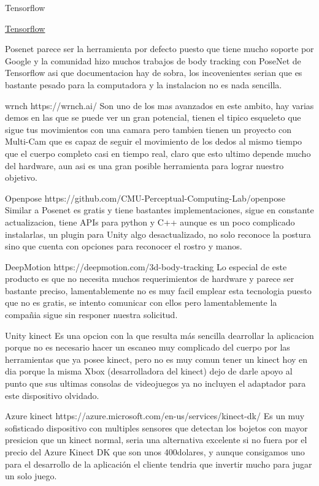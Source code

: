 Tensorflow

\href{https://www.tensorflow.org/lite/models/pose_estimation/overview}{Tensorflow}


Posenet parece ser la herramienta por defecto puesto que tiene mucho soporte por Google y la comunidad hizo muchos trabajos de body tracking con PoseNet de Tensorflow asi que documentacion hay de sobra, los incovenientes serian que es bastante pesado para la computadora y la instalacion no es nada sencilla.

wrnch
https://wrnch.ai/
Son uno de los mas avanzados en este ambito, hay varias demos en las que se puede ver un gran potencial, tienen el tipico esqueleto que sigue tus movimientos con una camara pero tambien tienen un proyecto con Multi-Cam que es capaz de seguir el movimiento de los dedos al mismo tiempo que el cuerpo completo casi en tiempo real, claro que esto ultimo depende mucho del hardware, aun asi es una gran posible herramienta para lograr nuestro objetivo.

Openpose
https://github.com/CMU-Perceptual-Computing-Lab/openpose
Similar a Posenet es gratis y tiene bastantes implementaciones, sigue en constante actualizacion, tiene APIs para python y C++ aunque es un poco complicado instalarlas, un plugin para Unity algo desactualizado, no solo reconoce la postura sino que cuenta con opciones para reconocer el rostro y manos.

DeepMotion
https://deepmotion.com/3d-body-tracking
Lo especial de este producto es que no necesita muchos requerimientos de hardware y parece ser bastante preciso, lamentablemente no es muy facil emplear esta tecnologia puesto que no es gratis, se intento comunicar con ellos pero lamentablemente la compañia sigue sin responer nuestra solicitud.

Unity kinect
Es una opcion con la que resulta más sencilla dearrollar la aplicacion porque no es necesario hacer un escaneo muy complicado del cuerpo por las herramientas que ya posee kinect, pero no es muy comun tener un kinect hoy en dia porque la misma Xbox (desarrolladora del kinect) dejo de darle apoyo al punto que sus ultimas consolas de videojuegos ya no incluyen el adaptador para este dispositivo olvidado.

Azure kinect
https://azure.microsoft.com/en-us/services/kinect-dk/
Es un muy sofisticado dispositivo con multiples sensores que detectan los bojetos con mayor presicion que un kinect normal, seria una alternativa excelente si no fuera por el precio del Azure Kinect DK que son unos 400dolares, y aunque consigamos uno para el desarrollo de la aplicación el cliente tendria que invertir mucho para jugar un solo juego.

